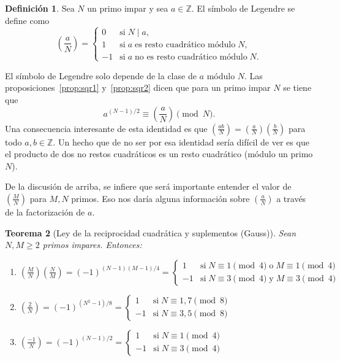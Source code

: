 \documentclass[a4paper, 11pt]{article}
\newcommand{\ZZ}{\mathbb{Z}}
\newcounter{numerodetema}
\theoremstyle{plain}
\newtheorem{teor}{Teorema}[numerodetema]
\theoremstyle{definition}
\newtheorem{defi}[teor]{Definición}
\begin{document}
\begin{defi}
Sea $N$ un primo impar y sea $a\in\ZZ$. El símbolo de Legendre se define
como
\[
\left(\frac{a}{N}\right)=\left\{\begin{array}{rl} 0 & \text{si}\;N\mid a, \\
1 & \text{si}\;a\;\text{es resto cuadrático módulo}\;N, \\
-1 & \text{si}\;a\;\text{no es resto cuadrático módulo}\;N.
\end{array}\right.
\]
\end{defi}
El símbolo de Legendre solo depende de la clase de $a$ módulo $N$. Las
proposiciones~\ref{prop:sqr1} y~\ref{prop:sqr2} dicen que para un primo impar
$N$ se tiene que
\begin{equation}\label{eq-legendre}
   a^{(N-1)/2}\equiv\left(\frac{a}{N}\right)\pmod{N}.
\end{equation}
Una consecuencia interesante de esta identidad es que $\left(\frac{ab}{N}\right)=
\left(\frac{a}{N}\right)\left(\frac{b}{N}\right)$ para todo $a,b\in\ZZ$.
Un hecho que de no ser por esa identidad sería difícil de ver es que el
producto de dos no restos cuadráticos es un resto cuadrático (módulo un primo $N$).

\bigskip

De la discusión de arriba, se infiere que será importante entender el
valor de $\left(\frac{M}{N}\right)$ para $M,N$ primos. Eso nos daría
alguna información sobre $\left(\frac{a}{N}\right)$ a través de la
factorización de $a$.

\begin{teor}[Ley de la reciprocidad cuadrática y suplementos (Gauss)]
\label{teor-lrc}
Sean $N,M\geq 2$ primos impares. Entonces:
\begin{enumerate}
\item $\left(\frac{M}{N}\right)\left(\frac{N}{M}\right)=(-1)^{(N-1)(M-1)/4}=
\left\{\begin{array}{rl}
1 & \text{si}\;N\equiv1\pmod{4}\;\text{o}\;M\equiv1\pmod{4} \\
-1& \text{si}\;N\equiv3\pmod{4}\;\text{y}\;M\equiv3\pmod{4}
\end{array}\right.$
\item $\left(\frac{2}{N}\right)=(-1)^{(N^2-1)/8}=\left\{\begin{array}{rl}
1 & \text{si}\;N\equiv1,7\pmod{8} \\
-1& \text{si}\;N\equiv3,5\pmod{8}
\end{array}\right.$
\item $\left(\frac{-1}{N}\right)=(-1)^{(N-1)/2}=\left\{\begin{array}{rl}
1 & \text{si}\;N\equiv1\pmod{4} \\
-1& \text{si}\;N\equiv3\pmod{4}
\end{array}\right.$
\end{enumerate}
\end{teor}
\end{document}
